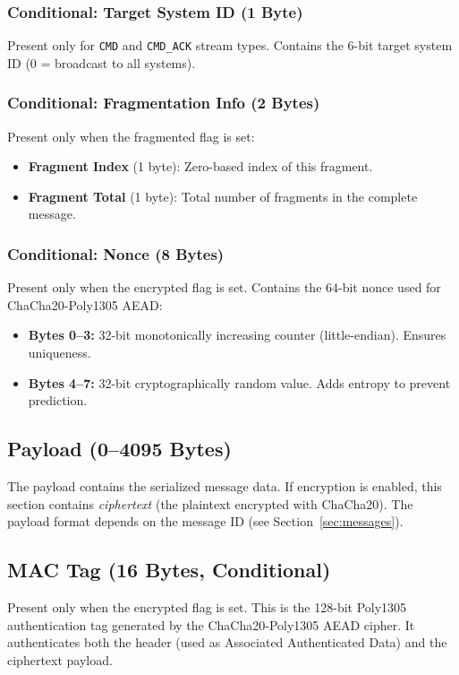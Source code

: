 \documentclass[11pt,a4paper]{article}
\begin{document}
\subsubsection{Conditional: Target System ID (1 Byte)}
Present only for \texttt{CMD} and \texttt{CMD\_ACK} stream types. Contains the 6-bit target system ID (0 = broadcast to all systems).

\subsubsection{Conditional: Fragmentation Info (2 Bytes)}
Present only when the fragmented flag is set:
\begin{itemize}[noitemsep]
    \item \textbf{Fragment Index} (1 byte): Zero-based index of this fragment.
    \item \textbf{Fragment Total} (1 byte): Total number of fragments in the complete message.
\end{itemize}

\subsubsection{Conditional: Nonce (8 Bytes)}
Present only when the encrypted flag is set. Contains the 64-bit nonce used for ChaCha20-Poly1305 AEAD:
\begin{itemize}[noitemsep]
    \item \textbf{Bytes 0--3:} 32-bit monotonically increasing counter (little-endian). Ensures uniqueness.
    \item \textbf{Bytes 4--7:} 32-bit cryptographically random value. Adds entropy to prevent prediction.
\end{itemize}

\subsection{Payload (0--4095 Bytes)}

The payload contains the serialized message data. If encryption is enabled, this section contains \emph{ciphertext} (the plaintext encrypted with ChaCha20). The payload format depends on the message ID (see Section~\ref{sec:messages}).

\subsection{MAC Tag (16 Bytes, Conditional)}

Present only when the encrypted flag is set. This is the 128-bit Poly1305 authentication tag generated by the ChaCha20-Poly1305 AEAD cipher. It authenticates both the header (used as Associated Authenticated Data) and the ciphertext payload.
\end{document}

